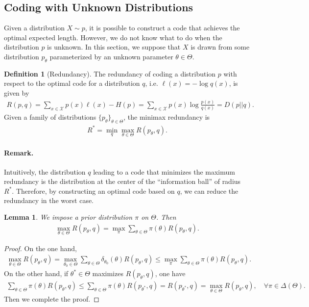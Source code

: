 \documentclass{article}
\numberwithin{equation}{section}
\renewcommand{\cal}{\mathcal}
\theoremstyle{plain}
\newtheorem{lemma}[theorem]{Lemma}
\theoremstyle{definition}
\newtheorem{definition}[theorem]{Definition}
\begin{document}
\subsection{Coding with Unknown Distributions}
Given a distribution $X\sim p$, it is possible to construct a code that achieves the optimal expected length. However, we do not know what to do when the distribution $p$ is unknown. In this section, we suppose that $X$ is drawn from some distribution $p_\theta$ parameterized by an unknown parameter $\theta\in\Theta$.

\begin{definition}[Redundancy] The redundancy of coding a distribution $p$ with respect to the optimal code for a distribution $q$, i.e. $\ell(x)=-\log q(x)$, is given by
\begin{align*}
	R(p,q)=\sum_{x\in\cal{X}}p(x)\ell(x)-H(p)=\sum_{x\in\cal{X}}p(x)\log\frac{p(x)}{q(x)}=D(p||q).
\end{align*}
Given a family of distributions $\{p_\theta\}_{\theta\in\Theta}$, the minimax redundancy is
\begin{align*}
	R^*=\min_{q}\max_{\theta\in\Theta}R(p_\theta,q).
\end{align*}
\end{definition}
\paragraph{Remark.} Intuitively, the distribution $q$ leading to a code that minimizes the maximum redundancy is the distribution at the center of the ``information ball'' of radius $R^*$. Therefore, by constructing an optimal code based on $q$, we can reduce the redundancy in the worst case.

\begin{lemma}\label{lemma:2.9}
We impose a prior distribution $\pi$ on $\Theta$. Then
\begin{align*}
	\max_{\theta\in\Theta}R(p_\theta,q)=\max_{\pi}\sum_{\theta\in\Theta}\pi(\theta)R(p_\theta,q).
\end{align*}
\end{lemma}
\begin{proof}
On the one hand,
\begin{align*}
	\max_{\theta\in\Theta}R(p_\theta,q)=\max_{\theta_0\in\Theta}\sum_{\theta\in\Theta}\delta_{\theta_0}(\theta)R(p_\theta,q)\leq\max_{\pi}\sum_{\theta\in\Theta}\pi(\theta)R(p_\theta,q).
\end{align*}
On the other hand, if $\theta^*\in\Theta$ maximizes $R(p_\theta,q)$, one have
\begin{align*}
	\sum_{\theta\in\Theta}\pi(\theta)R(p_\theta,q)\leq \sum_{\theta\in\Theta}\pi(\theta)R(p_{\theta^*},q)=R(p_{\theta^*},q)=\max_{\theta\in\Theta}R(p_\theta,q),\quad\forall\pi\in\Delta(\Theta).
\end{align*}
Then we complete the proof.
\end{proof}
\end{document}
